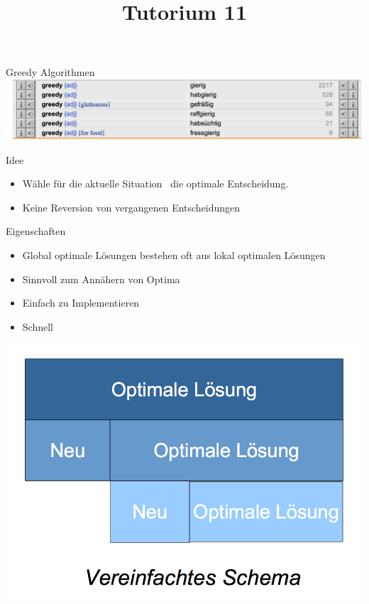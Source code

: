 
\title[Algorithmen I SS 14]{Tutorium 11}

\usepackage{alltt}




\begin{frame}
  \maketitle
\end{frame}

\begin{frame}{Greedy Algorithmen}
	\includegraphics[width=\textwidth]{images/transla}
	\centerline{\huge{Idee}}
	\begin{itemize}
		\item Wähle für die \color{OliveGreen}aktuelle Situation\color{black} \ die optimale Entscheidung.
		\item Keine Reversion von vergangenen Entscheidungen
	\end{itemize}

\end{frame}


\begin{frame}{Eigenschaften}
	\begin{itemize}
		\item Global optimale Lösungen bestehen oft aus lokal optimalen Lösungen 
		\item Sinnvoll zum Annähern von Optima
		\item Einfach zu Implementieren
		\item Schnell
	\end{itemize}
	\includegraphics[scale = 0.2]{images/idee}

\end{frame}


